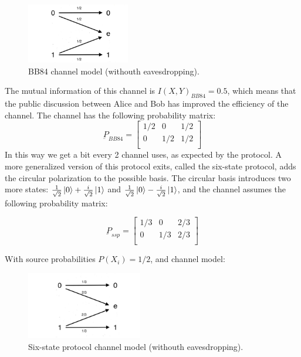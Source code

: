 \documentclass[journal, letterpaper]{IEEEtran}
\begin{document}
\begin{figure}[!h]
    \centering
    \includegraphics[width=0.4\textwidth]{Images/bec_bb84.jpg}
        \caption{BB84 channel model (withouth eavesdropping).}
     \label{fig:quadtree}
\end{figure} 

The mutual information of this channel is $I(X,Y)_{BB84} = 0.5$, which means that
the public discussion between Alice and Bob has improved the efficiency of the channel.
The channel has the following probability matrix: 
\[\underbar{P}_{BB84} = \begin{bmatrix}
    1/2 & 0 & 1/2\\
    0 & 1/2 &  1/2 \\
\end{bmatrix}\] 
In this way we get a bit every 2 channel uses, as expected by the protocol. 
A more generalized version of this protocol exits, called the six-state protocol, adds the circular polarization to the possible basis. The circular basis introduces two more states: $\frac{1}{\sqrt{2}}\ket{0}+\frac{i}{\sqrt{2}}\ket{1}$ and $\frac{1}{\sqrt{2}}\ket{0}-\frac{i}{\sqrt{2}}\ket{1}$, and the channel assumes the following probability matrix: 

\[\underbar{P}_{ssp} = \begin{bmatrix}
    1/3 & 0 & 2/3\\
    0 & 1/3 &  2/3 \\
\end{bmatrix}\] 

With source probabilities $P(X_i) = 1/2$, and channel model:

\begin{figure}[!h]
    \centering
    \includegraphics[width=0.45\textwidth]{Images/bec_ssp.jpg}
        \caption{Six-state protocol channel model (withouth eavesdropping).}
     \label{fig:quadtree}
\end{figure} 
\end{document}
